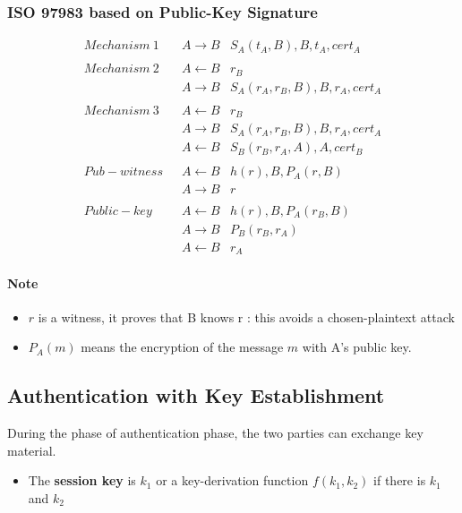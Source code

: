 \subsubsection{ISO 9798\text{-}3 based on Public-Key Signature}
\begin{eqnarray*}
    Mechanism~1 \quad & A \rightarrow B & S_A(t_A,B),B,t_A,cert_A \\
    \\
    Mechanism~2 \quad & A \leftarrow B & r_B\\
                      & A \rightarrow B &
    S_A(r_A,r_B,B),B,r_A,cert_A \\
    \\
    Mechanism~3 \quad & A \leftarrow B & r_B \\
                      & A \rightarrow B &
    S_A(r_A,r_B,B),B,r_A,cert_A \\
    & A \leftarrow B & S_B(r_B, r_A, A), A, cert_B \\
    \\
    Pub-witness & A \leftarrow B & h(r), B, P_A(r, B) \\
    & A \rightarrow B & r \\
    \\
    Public-key & A \leftarrow B & h(r), B, P_A(r_B, B) \\
                                    & A \rightarrow B & P_B(r_B, r_A)\\
                                    & A \leftarrow B & r_A
\end{eqnarray*}

\paragraph{Note} 
\begin{itemize}
    \item $r$ is a witness, it proves that B knows r : this avoids a
        chosen-plaintext attack
    \item $P_A(m)$ means the
        encryption of the message $m$ with A’s public key.
\end{itemize}

\subsection{Authentication with Key Establishment}
During the phase of authentication phase, the two parties can exchange key
material.

\begin{itemize}
    \item The \textbf{session key} is $k_1$ or a key-derivation function  
        $f(k_1,k_2)$ if there is $k_1$ and $k_2$
\end{itemize}

